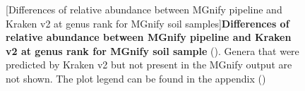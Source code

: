 \begin{figure}[H]
  \centering
  [Differences of relative abundance between MGnify pipeline and Kraken v2 at genus rank for MGnify soil samples]{\textbf{Differences of relative abundance between MGnify pipeline and Kraken v2 at genus rank for MGnify soil sample} (). Genera that were predicted by Kraken v2 but not present in the MGnify output are not shown. The plot legend can be found in the appendix ()} \label{fig:soil_rel_abundance_mgnifyVSkraken2}%
\end{figure}
\newpage

